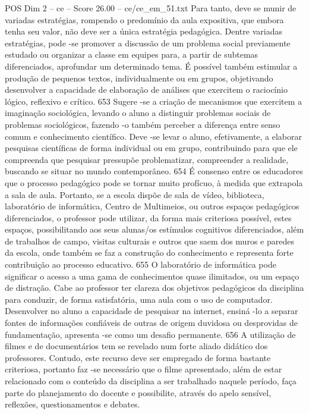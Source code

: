 \begin{textsample}{POS Dim 2 – ce – Score 26.00 – ce/ce\_em\_51.txt}
Para tanto, deve se munir de variadas estratégias, rompendo o predomínio da aula expositiva, que embora tenha seu valor, não deve ser a única estratégia pedagógica.
Dentre variadas estratégias, pode -se promover a discussão de um problema social previamente estudado ou organizar a classe em equipes para, a partir de subtemas diferenciados, aprofundar um determinado tema.
É possível também estimular a produção de pequenos textos, individualmente ou em grupos, objetivando desenvolver a capacidade de elaboração de análises que exercitem o raciocínio lógico, reflexivo e crítico. 653 Sugere -se a criação de mecanismos que exercitem a imaginação sociológica, levando o aluno a distinguir problemas sociais de problemas sociológicos, fazendo -o também perceber a diferença entre senso comum e conhecimento científico.
Deve -se levar o aluno, efetivamente, a elaborar pesquisas científicas de forma individual ou em grupo, contribuindo para que ele compreenda que pesquisar pressupõe problematizar, compreender a realidade, buscando se situar no mundo contemporâneo. 654 É consenso entre os educadores que o processo pedagógico pode se tornar muito profícuo, à medida que extrapola a sala de aula.
Portanto, se a escola dispõe de sala de vídeo, biblioteca, laboratório de informática, Centro de Multimeios, ou outros espaços pedagógicos diferenciados, o professor pode utilizar, da forma mais criteriosa possível, estes espaços, possibilitando aos seus alunas/os estímulos cognitivos diferenciados, além de trabalhos de campo, visitas culturais e outros que saem dos muros e paredes da escola, onde também se faz a construção do conhecimento e representa forte contribuição ao processo educativo. 655 O laboratório de informática pode significar o acesso a uma gama de conhecimentos quase ilimitados, ou um espaço de distração.
Cabe ao professor ter clareza dos objetivos pedagógicos da disciplina para conduzir, de forma satisfatória, uma aula com o uso de computador.
Desenvolver no aluno a capacidade de pesquisar na internet, ensiná -lo a separar fontes de informações confiáveis de outras de origem duvidosa ou desprovidas de fundamentação, apresenta -se como um desafio permanente. 656 A utilização de filmes e de documentários tem se revelado num forte aliado didático dos professores.
Contudo, este recurso deve ser empregado de forma bastante criteriosa, portanto faz -se necessário que o filme apresentado, além de estar relacionado com o conteúdo da disciplina a ser trabalhado naquele período, faça parte do planejamento do docente e possibilite, através do apelo sensível, reflexões, questionamentos e debates.

\end{textsample}
